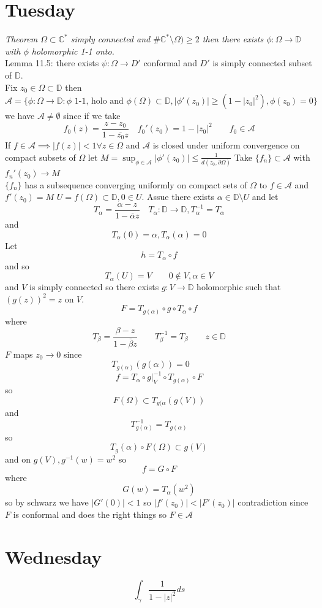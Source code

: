 \documentclass[11pt]{article}
\begin{document}
\section{Tuesday}
\emph{
    Theorem $\Omega \subset \mathbb{C}^{*}$ simply connected and $\# \mathbb{C}^{*} \setminus \Omega) \ge 2$ then 
    there exists $\phi : \Omega \to \mathbb{D}$ with $\phi$ holomorphic 1-1 onto.
}\\
Lemma 11.5:
there exists $\psi : \Omega \to D'$ conformal and  $D'$ is simply connected subset of  $\mathbb{D}$.\\
Fix $z_0 \in \Omega \subset \mathbb{D}$ then
\[
\mathcal{A} = \{\phi : \Omega \to \mathbb{D}: \phi \text{ 1-1, holo and } \phi(\Omega) \subset \mathbb{D}, |\phi'(z_0)| \ge (1 - |z_0|^2), \phi(z_0) = 0\}
\] 
we have $\mathcal{A} \ne \emptyset$  since if we take 
\[
    f_0(z) = \frac{z-z_0}{1-\overline{z_0}z}  \quad f_0'(z_0) = 1 - |z_0|^2 \qquad f_0 \in \mathcal{A}
\] 
If $f \in \mathcal{A} \implies |f(z)| < 1 \forall z \in \Omega$
and  $\mathcal{A}$ is closed under uniform convergence on compact subsets of  $\Omega$
let  $M = \sup_{\phi \in \mathcal{A}} |\phi'(z_0)| \le \frac{1}{d(z_0, \partial \Omega)}$ 
Take $\{f_n\} \subset \mathcal{A}$ with $f_n'(z_0) \to M$\\
$\{f_n\}$ has a subsequence converging uniformly on compact sets of  $\Omega$ to  $f \in \mathcal{A}$ and $f'(z_0) = M$
$U = f(\Omega) \subset \mathbb{D}, 0 \in U$. Assue there exists $\alpha \in \mathbb{D} \setminus U$ and let
\[
    T_\alpha = \frac{\alpha - z}{1 - \overline{\alpha}z} \quad T_\alpha : \mathbb{D} \to \mathbb{D}, T_\alpha^{-1} = T_\alpha
\] 
and 
\[
T_\alpha(0) = \alpha, T_\alpha(\alpha) = 0
\] 
Let
\[
h = T_\alpha \circ f
\] 
and so
\[
T_\alpha(U) = V \qquad 0 \not\in V, \alpha \in V
\] 
and $V$ is simply connected so there exists $g: V \to \mathbb{D}$ holomorphic such that $(g(z))^2 = z$ on $V$.
 \[
     F = T_{g(\alpha)} \circ g \circ T_\alpha \circ f
\] 
where
\[
    T_\beta = \frac{\beta - z}{1 - \overline{\beta }z} \qquad T_\beta^{-1} = T_\beta \qquad z \in \mathbb{D}
\] 
$F$ maps $z_0 \to 0$ since
 \[
     T_{g(\alpha)}(g(\alpha)) = 0 \qquad
\] 
\[
    f =  T_\alpha \circ g|_V^{-1} \circ T_{g(\alpha)} \circ F
\] 
so
\[
    F(\Omega) \subset T_{g(\alpha}(g(V)) 
\] 
and
\[
    T_{g(\alpha)}^{-1} = T_{g(\alpha)}
\] 
so
\[
T_g(\alpha) \circ F(\Omega) \subset g(V)
\] 
and on $g(V), g^{-1}(w) = w^2$ so
\[
f = G \circ F
\] 
where
\[
    G(w) = T_\alpha(w^2) %
\] 
so by schwarz we have $|G'(0)| < 1$ so $|f'(z_0)| < |F'(z_0)|$ contradiction since $F$ is conformal and does the right things so $F \in \mathcal{A}$

\section{Wednesday}

\[
\int_{\gamma}^{} \frac{1}{1-|z|^2}ds
\] 
\end{document}
